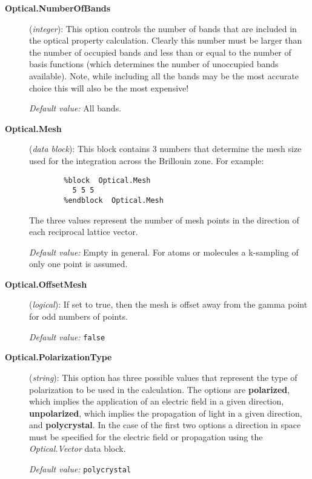 \begin{description}
\item[\textbf{Optical.NumberOfBands}] (\textit{integer}):
This option controls the number of bands that are included in
the optical property calculation. Clearly this number must be
larger than the number of occupied bands and less than or
equal to the number of basis functions (which determines the
number of unoccupied bands available). Note, while including
all the bands may be the most accurate choice this will also
be the most expensive!

\textit{Default value:} All bands.

\item[\textbf{Optical.Mesh}] (\textit{data block}):
This block contains 3 numbers that determine the mesh size
used for the integration across the Brillouin zone. For
example:

\begin{verbatim}
        %block  Optical.Mesh
          5 5 5
        %endblock  Optical.Mesh
\end{verbatim}

The three values represent the number of mesh points in
the direction of each reciprocal lattice vector.

\textit{Default value:} Empty in general. For atoms
or molecules a k-sampling of only one point is assumed.

\item[\textbf{Optical.OffsetMesh}] (\textit{logical}):
If set to true, then the mesh is offset away from the
gamma point for odd numbers of points.

\textit{Default value:} \texttt{false}

\item[\textbf{Optical.PolarizationType}] (\textit{string}):
This option has three possible values that represent the
type of polarization to be used in the calculation. The options
are \textbf{polarized}, which implies the application of an electric
field in a given direction, \textbf{unpolarized}, which implies the
propagation of light in a given direction, and \textbf{polycrystal}.
In the case of the first two options a direction in space must
be specified for the electric field or propagation using the
\textit{Optical.Vector} data block.

\textit{Default value:} \texttt{polycrystal}


\end{description}
